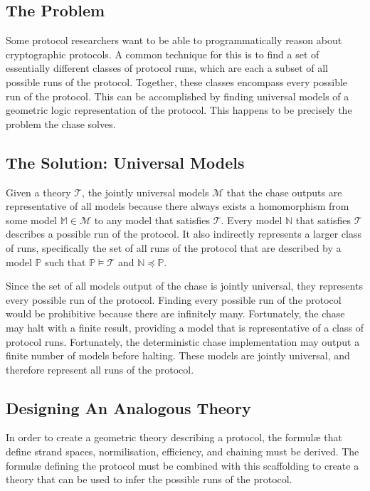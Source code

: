 	\subsection{The Problem}

		Some protocol researchers want to be able to programmatically reason
		about cryptographic protocols. A common technique for this is to find a
		set of essentially different classes of protocol runs, which are each a
		subset of all possible runs of the protocol. Together, these classes
		encompass every possible run of the protocol. This can be accomplished
		by finding universal models of a geometric logic representation of the
		protocol. This happens to be precisely the problem the chase solves.

	\subsection{The Solution: Universal Models}

		Given a theory $\mathcal{T}$, the jointly universal models
		$\mathcal{M}$ that the chase outputs are representative of all models
		because there always exists a homomorphism from some model $\mathbb{M}
		\in \mathcal{M}$ to any model that satisfies $\mathcal{T}$. Every model
		$\mathbb{N}$ that satisfies $\mathcal{T}$ describes a possible run of
		the protocol. It also indirectly represents a larger class of runs,
		specifically the set of all runs of the protocol that are described by
		a model $\mathbb{P}$ such that $\mathbb{P} \models \mathcal{T}$ and
		$\mathbb{N} \preceq \mathbb{P}$.

		Since the set of all models output of the chase is jointly universal,
		they represents every possible run of the protocol. Finding every
		possible run of the protocol would be prohibitive because there are
		infinitely many. Fortunately, the chase may halt with a finite result,
		providing a model that is representative of a class of protocol runs.
		Fortunately, the deterministic chase implementation may output a finite
		number of models before halting. These models are jointly universal,
		and therefore represent all runs of the protocol.

	\subsection{Designing An Analogous Theory}

		In order to create a geometric theory describing a protocol, the
		formul{\ae} that define strand spaces, normilisation, efficiency, and
		chaining must be derived. The formul{\ae} defining the protocol must be
		combined with this scaffolding to create a theory that can be used to
		infer the possible runs of the protocol.

